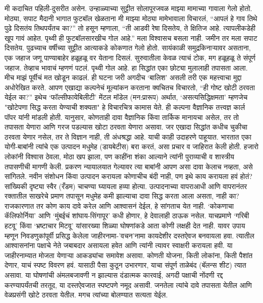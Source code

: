 मी कदाचित पहिली-दुसरीत असेन. उन्हाळ्याच्या सुट्टीत सोलापूरजवळ माझ्या मामाच्या गावाला गेलो होतो. मोठ्या, सपाट मैदानी भागात फुटबॉल खेळताना मी माझ्या मोठ्या मामेभावाला विचारलं, “आपलं हे गाव तिथे पुढे दिसतंय तिथपर्यंतच का?” तो हसून म्हणाला, “ती आडवी रेषा दिसतेय, ते क्षितिज आहे. त्यापलीकडेही खूप गावं आहेत. पृथ्वी ही फुटबॉलसारखीच गोल आहे.” मला विश्वासच बसला नाही. जमीन तर मला सपाट दिसतेय. पुढच्याच वर्षीच्या सुट्टीत आत्याकडे कोकणात गेलो होतो. सायंकाळी समुद्रकिनाऱ्यावर असताना, एक जहाज जणू पाण्याबाहेर हळूहळू वर येताना दिसलं. सुरुवातीला केवळ त्याचं टोक, मग हळूहळू ते संपूर्ण जहाज. तेव्हाच भावाचं म्हणणं पटलं. पृथ्वी गोल आहे. हा सिद्धांत एका छोट्या मुलालाही तपासता आला. मीच माझं पूर्वीचं मत खोडून काढलं.
ही घटना जरी अगदीच ‘बालिश’ असली तरी एक महत्त्वाचा मुद्दा अधोरेखित करते. आपण एखाद्या कल्पनेचं मूल्यांकन करताना क्वचितच विचारतो, “ही गोष्ट खोटी ठरवता येईल का?” इथेच ‘फॉल्सीफायेबिलीटी’ मेंटल मॉडेल (मन:प्रारूप) अर्थात, ‘असत्यसिद्धिक्षमता’ म्हणजेच "खोटेपणा सिद्ध करता येण्याची शक्यता" हे विचारचित्र कामास येते. ही कल्पना वैज्ञानिक तत्त्वज्ञ कार्ल पॉपर यांनी मांडली होती. यानुसार, कोणताही दावा वैज्ञानिक किंवा तार्किक मानायचा असेल, तर तो तपासता येणारा आणि गरज पडल्यास खोटा ठरवता येणारा असावा. जर एखादा सिद्धांत कधीच चुकीचा ठरवता येणार नसेल, तर ते विज्ञान नाही, ती अंधश्रद्धा आहे. याची काही उदाहरणे पाहूयात. 
भारतात एका योगी-बाबांनी त्यांचे एक उत्पादन मधुमेह (डायबेटीस) बरा करतं, असा प्रचार व जाहिरात केली होती. हजारो लोकांनी विश्वास ठेवला, मोठा खप झाला, पण काहींना शंका आल्याने त्यांनी पुराव्याची व शास्त्रीय तपासणीची मागणी केली. प्रकरण न्यायालयात गेल्यावर त्या बाबांनी आपण असा दावा केलाच नव्हता, असे सांगितले. नवीन संशोधन किंवा उत्पादन करायला कोणाचीच बंदी नाही, पण इथे काय करायला हवं होतं? सांख्यिकी दृष्ट्या स्वैर (रँडम) चाचण्या घ्यायला हव्या होत्या. उत्पादनाच्या वापराआधी आणि वापरानंतर रक्तातील साखरेचे प्रमाण तपासून मधुमेह कमी झाल्याचा दावा सिद्ध करता आला असता, नाही का?
राजकारणात तर कोण काय दावे करेल आणि आश्वासनं देईल, हे सांगताच येत नाही. ‘कोकणाचा कॅलिफोर्निया’ आणि ‘मुंबईचं शांघाय-सिंगापूर’ कधी होणार, हे देवालाही ठाऊक नसेल. याचप्रमाणे ‘गरिबी हटवू’ किंवा ‘भ्रष्टाचार मिटवू’ यांसारख्या शिळ्या घोषणांकडे आता कोणी लक्षही देत नाही. यावर उपाय म्हणून निवडणुकांपूर्वी प्रसिद्ध केलेला जाहीरनामा-’वचन’नामा कायदेशीर दस्तऐवज बनवायला हवा. त्यातील आश्वासनांना पक्षाचे नेते जबाबदार असायला हवेत आणि त्यांनी त्यावर स्वाक्षरी करायला हवी. या जाहीरनाम्यात मोजता येणाऱ्या आकड्यांचा समावेश असावा. कोणती योजना, किती लोकांना, किती पैशांत देणार, याचं स्पष्ट विवरण हवं. यासाठी पैसा कुठून उभारणार, याचा संपूर्ण ताळेबंद (बॅलन्स शीट) त्यात असावा. या घोषणांची अंमलबजावणी न झाल्यास दंडात्मक कारवाई, अगदी पक्षाची नोंदणी रद्द करण्यापर्यंतची तरतूद, या दस्तऐवजात स्पष्टपणे नमूद असावी. जनतेला त्यांचे दावे तपासता येतील आणि वेळप्रसंगी खोटे ठरवता येतील. मगच त्यांच्या बोलण्यात सत्यता येईल.

